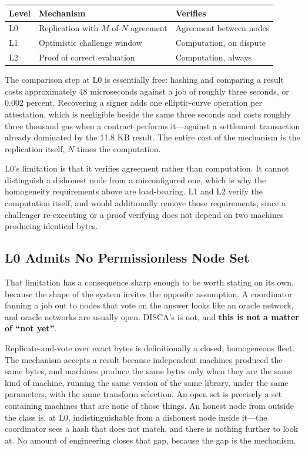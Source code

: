 \documentclass[12pt,a4paper]{article}
\begin{document}
\begin{center}
\begin{tabular}{lll}
\hline
Level & Mechanism & Verifies \\
\hline
L0 & Replication with $M$-of-$N$ agreement & Agreement between nodes \\
L1 & Optimistic challenge window & Computation, on dispute \\
L2 & Proof of correct evaluation & Computation, always \\
\hline
\end{tabular}
\end{center}

The comparison step at L0 is essentially free: hashing and comparing a result costs approximately 48 microseconds against a job of roughly three seconds, or 0.002 percent.
Recovering a signer adds one elliptic-curve operation per attestation, which is negligible beside the same three seconds and costs roughly three thousand gas when a contract performs it---against a settlement transaction already dominated by the 11.8 KB result.
The entire cost of the mechanism is the replication itself, $N$ times the computation.

L0's limitation is that it verifies agreement rather than computation.
It cannot distinguish a dishonest node from a misconfigured one, which is why the homogeneity requirements above are load-bearing.
L1 and L2 verify the computation itself, and would additionally remove those requirements, since a challenger re-executing or a proof verifying does not depend on two machines producing identical bytes.

\subsection{L0 Admits No Permissionless Node Set}

That limitation has a consequence sharp enough to be worth stating on its own, because the shape of the system invites the opposite assumption.
A coordinator fanning a job out to nodes that vote on the answer looks like an oracle network, and oracle networks are usually open.
DISCA's is not, and \textbf{this is not a matter of ``not yet''}.

Replicate-and-vote over exact bytes is definitionally a closed, homogeneous fleet.
The mechanism accepts a result because independent machines produced the same bytes, and machines produce the same bytes only when they are the same kind of machine, running the same version of the same library, under the same parameters, with the same transform selection.
An open set is precisely a set containing machines that are none of those things.
An honest node from outside the class is, at L0, indistinguishable from a dishonest node inside it---the coordinator sees a hash that does not match, and there is nothing further to look at.
No amount of engineering closes that gap, because the gap is the mechanism.
\end{document}
